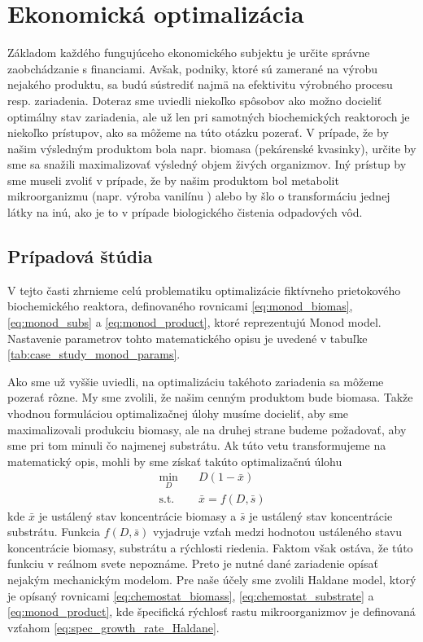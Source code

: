\section{Ekonomická optimalizácia}
Základom každého fungujúceho ekonomického subjektu je určite správne zaobchádzanie s financiami. Avšak, podniky, ktoré sú zamerané na výrobu nejakého produktu, sa budú sústrediť najmä na efektivitu výrobného procesu resp. zariadenia. Doteraz sme uviedli niekoľko spôsobov ako možno docieliť optimálny stav zariadenia, ale už len pri samotných biochemických reaktoroch je niekoľko prístupov, ako sa môžeme na túto otázku pozerať. V prípade, že by našim výsledným produktom bola napr. biomasa (pekárenské kvasinky), určite by sme sa snažili maximalizovať výsledný objem živých organizmov. Iný prístup by sme museli zvoliť v prípade, že by našim produktom bol metabolit mikroorganizmu (napr. výroba vanilínu \cite{hansen:vanilin_biosyn:2009}) alebo by šlo o transformáciu jednej látky na inú, ako je to v prípade biologického čistenia odpadových vôd.

\subsection{Prípadová štúdia}
V tejto časti zhrnieme celú problematiku optimalizácie fiktívneho prietokového biochemického reaktora, definovaného rovnicami \eqref{eq:monod_biomas}, \eqref{eq:monod_subs} a \eqref{eq:monod_product}, ktoré reprezentujú Monod model. Nastavenie parametrov tohto matematického opisu je uvedené v tabuľke \ref{tab:case_study_monod_params}.

Ako sme už vyššie uviedli, na optimalizáciu takéhoto zariadenia sa môžeme pozerať rôzne. My sme zvolili, že našim cenným produktom bude biomasa. Takže vhodnou formuláciou optimalizačnej úlohy musíme docieliť, aby sme maximalizovali produkciu biomasy, ale na druhej strane budeme požadovať, aby sme pri tom minuli čo najmenej substrátu. Ak túto vetu transformujeme na matematický opis, mohli by sme získať takúto optimalizačnú úlohu
\begin{equation}
	\begin{split}
		\min_{D} &\quad D\left(1-\bar{x}\right) \\
		\text{s.t.} &\quad \bar{x} = f(D,\bar{s})
	\end{split}
\end{equation}
kde $ \bar{x} $ je ustálený stav koncentrácie biomasy a $ \bar{s} $ je ustálený stav koncentrácie substrátu. Funkcia $ f(D,\bar{s}) $ vyjadruje vzťah medzi hodnotou ustáleného stavu koncentrácie biomasy, substrátu a rýchlosti riedenia. Faktom však ostáva, že túto funkciu v reálnom svete nepoznáme. Preto je nutné dané zariadenie opísať nejakým mechanickým modelom. Pre naše účely sme zvolili Haldane model, ktorý je opísaný rovnicami \eqref{eq:chemostat_biomass}, \eqref{eq:chemostat_substrate} a \eqref{eq:monod_product}, kde špecifická rýchlosť rastu mikroorganizmov je definovaná vzťahom \eqref{eq:spec_growth_rate_Haldane}. 

